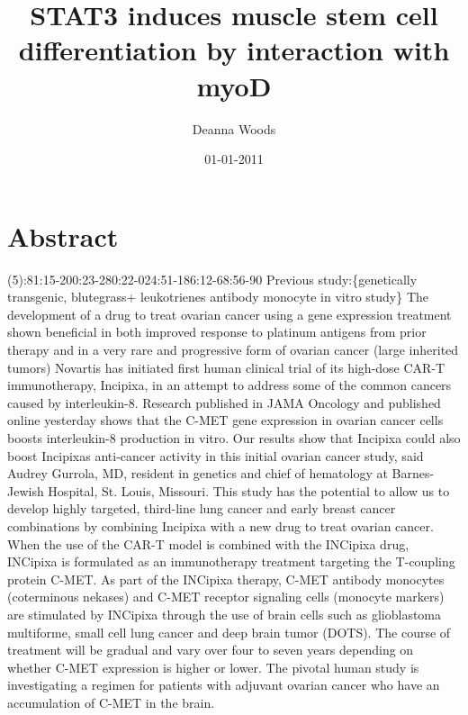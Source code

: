 \documentclass{article}%
\title{STAT3 induces muscle stem cell differentiation by interaction with myoD}%
\author{Deanna Woods}%
\affil{Department of Surgery, University of Wisconsin Hospital and Clinics, Madison, Wisconsin, United States of America}%
\date{01{-}01{-}2011}%
\begin{document}
%
\normalsize%
\maketitle%
\section{Abstract}%
\label{sec:Abstract}%
(5):81:15{-}200:23{-}280:22{-}024:51{-}186:12{-}68:56{-}90\newline%
Previous study:\{genetically transgenic, blutegrass+ leukotrienes antibody monocyte in vitro study\}\newline%
The development of a drug to treat ovarian cancer using a gene expression treatment shown beneficial in both improved response to platinum antigens from prior therapy and in a very rare and progressive form of ovarian cancer (large inherited tumors)\newline%
Novartis has initiated first human clinical trial of its high{-}dose CAR{-}T immunotherapy, Incipixa, in an attempt to address some of the common cancers caused by interleukin{-}8. Research published in JAMA Oncology and published online yesterday shows that the C{-}MET gene expression in ovarian cancer cells boosts interleukin{-}8 production in vitro.\newline%
Our results show that Incipixa could also boost Incipixas anti{-}cancer activity in this initial ovarian cancer study, said Audrey Gurrola, MD, resident in genetics and chief of hematology at Barnes{-}Jewish Hospital, St. Louis, Missouri. This study has the potential to allow us to develop highly targeted, third{-}line lung cancer and early breast cancer combinations by combining Incipixa with a new drug to treat ovarian cancer.\newline%
When the use of the CAR{-}T model is combined with the INCipixa drug, INCipixa is formulated as an immunotherapy treatment targeting the T{-}coupling protein C{-}MET. As part of the INCipixa therapy, C{-}MET antibody monocytes (coterminous nekases) and C{-}MET receptor signaling cells (monocyte markers) are stimulated by INCipixa through the use of brain cells such as glioblastoma multiforme, small cell lung cancer and deep brain tumor (DOTS). The course of treatment will be gradual and vary over four to seven years depending on whether C{-}MET expression is higher or lower.\newline%
The pivotal human study is investigating a regimen for patients with adjuvant ovarian cancer who have an accumulation of C{-}MET in the brain.\newline%
\end{document}
